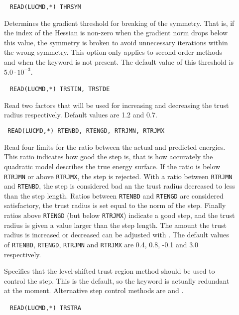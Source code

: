 \begin{description}
\item[]\verb| |
\newline
\verb|READ(LUCMD,*) THRSYM|

Determines the gradient threshold for breaking of the
symmetry. That is, if the index of the
Hessian is non-zero when the gradient norm
drops below this value, the symmetry is broken to avoid unnecessary
iterations within the wrong symmetry. This option only applies to
second-order methods and when the
keyword  is not present. The default value of this
threshold is $5.0\cdot 10^{-3}$.

\item[]\verb| |
\newline
\verb|READ(LUCMD,*) TRSTIN, TRSTDE|

Read two factors that will be used for increasing and decreasing the
trust radius respectively. Default values are
1.2 and 0.7.

\item[]\verb| |
\newline
\verb|READ(LUCMD,*) RTENBD, RTENGD, RTRJMN, RTRJMX|

Read four limits for the ratio between the actual and predicted
energies. This ratio indicates how good the step is, that is how
accurately the quadratic model describes the true energy
surface. If the ratio is below \verb|RTRJMN| or above
\verb|RTRJMX|, the step is rejected. With a ratio between
\verb|RTRJMN| and \verb|RTENBD|, the step is considered bad an the
trust radius decreased to less than the step
length. Ratios between \verb|RTENBD| and \verb|RTENGD| are
considered satisfactory, the trust radius is set equal to the norm
of the step. Finally ratios above \verb|RTENGD| (but below
\verb|RTRJMX|) indicate a good step, and the trust radius is given
a value larger than the step length. The amount the trust radius
is increased or decreased can be adjusted with . The
default values of \verb|RTENBD|, \verb|RTENGD|, \verb|RTRJMN| and
\verb|RTRJMX| are 0.4, 0.8, -0.1 and 3.0 respectively.

\item[]
Specifies that the level-shifted trust region method should be used to
control the step. This is the default, so the keyword is actually
redundant at the moment. Alternative step control methods are 
and .

\item[]\verb| |
\newline
\verb|READ(LUCMD,*) TRSTRA|


\end{description}
